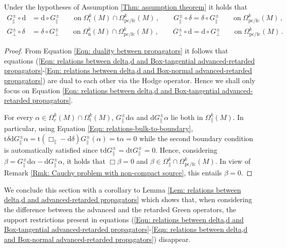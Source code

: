\begin{lemma}\label{Lem: relations between delta,d and advanced-retarded propagators}
	Under the hypotheses of Assumption \ref{Thm: assumption theorem} it holds that
	\begin{align}
	\label{Eqn: relations between delta,d and Box-tangential advanced-retarded propagators}
	G_\parallel^\pm\circ\mathrm{d}&=\mathrm{d}\circ G_\parallel^\pm
	\qquad\mathrm{on}\;\Omega_{\mathrm{t}}^k(M)\cap\Omega^k_{\mathrm{pc/fc}}(M)\,,\qquad
	G_\parallel^\pm\circ\delta=\delta\circ G_\parallel^\pm
	\qquad\mathrm{on}\;\Omega_{\mathrm{pc/fc}}^k(M)\,,\\
	\label{Eqn: relations between delta,d and Box-normal advanced-retarded propagators}
	G_\perp^\pm\circ\delta&=\delta\circ G^\pm_{\perp}
	\qquad\mathrm{on}\;\Omega^k_{\mathrm{n}}(M)\cap\Omega^k_{\mathrm{pc/fc}}(M)\,,\qquad
	G_\perp^\pm\circ\mathrm{d}=\mathrm{d}\circ G_\perp^\pm
	\qquad\mathrm{on}\;\Omega_{\mathrm{pc/fc}}^k(M)\,.
	\end{align}
\end{lemma}
\begin{proof}
	From Equation \eqref{Eqn: duality between propagators} it follows that equations (\ref{Eqn: relations between delta,d and Box-tangential advanced-retarded propagators}-\ref{Eqn: relations between delta,d and Box-normal advanced-retarded propagators}) are dual to each other via the Hodge operator.
	Hence we shall only focus on Equation \eqref{Eqn: relations between delta,d and Box-tangential advanced-retarded propagators}.
	
	For every $\alpha\in\Omega^k_{\mathrm{c}}(M)\cap\Omega^k_{\mathrm{t}}(M)$, $G^\pm_\parallel \mathrm{d}\alpha$ and $\mathrm{d}G^\pm_\parallel\alpha$ lie both in $\Omega^k_\parallel(M)$.
	In particular, using Equation \eqref{Eqn: relations-bulk-to-boundary}, $\mathrm{t}\delta \mathrm{d} G^\pm_\parallel\alpha=\mathrm{t}(\Box_\parallel-\mathrm{d}\delta)G^\pm_\parallel(\alpha)=\mathrm{t}\alpha=0$ while the second boundary condition is automatically satisfied since $\mathrm{td}G^\pm_\parallel=\mathrm{dt}G^\pm_\parallel=0$.
	Hence, considering $\beta=G^\pm_\parallel\mathrm{d}\alpha-\mathrm{d}G^\pm_\parallel\alpha$, it holds that $\Box\beta=0$ and $\beta\in\Omega^k_\parallel\cap\Omega^k_{\mathrm{pc/fc}}(M)$.
	In view of Remark \ref{Rmk: Cauchy problem with non-compact source}, this entails $\beta=0$.
\end{proof}

We conclude this section with a corollary to Lemma \ref{Lem: relations between delta,d and advanced-retarded propagators} which shows that, when considering the difference between the advanced and the retarded Green operators, the support restrictions present in equations (\ref{Eqn: relations between delta,d and Box-tangential advanced-retarded propagators}-\ref{Eqn: relations between delta,d and Box-normal advanced-retarded propagators}) disappear.

